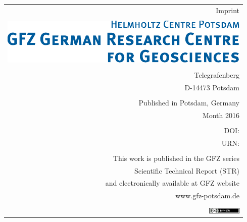 {{		%
		\begin{flushright}\vfill
			\begin{tabular}{r}
				{\normalsize Imprint} \\
				\\
				\includegraphics{gfzlogo_ur.pdf} \\
				\\
				Telegrafenberg \\
				D-14473 Potsdam  \\ 
				\\
				Published in Potsdam, Germany \\
				Month 2016 \\
				\rstIssn \\
				DOI: \href{\rstDoiUrl}{\rstDoiStr} \\
				URN: \rstUrn \\
				\\
				This work is published in the GFZ series \\
				Scientific Technical Report (STR) \\
				and electronically available at GFZ website \\
				www.gfz-potsdam.de \\
				\\
				\href{http://creativecommons.org/licenses/by-sa/4.0/}{\includegraphics{creative_common1.png}}
			\end{tabular}
		\end{flushright}
	}
	\thispagestyle{empty}
	\clearpage

	\thispagestyle{empty}
	\clearpage
}
\makeatother